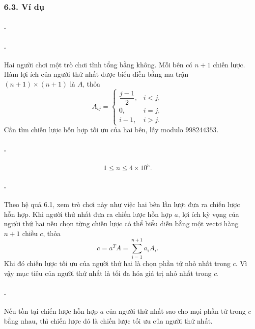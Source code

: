 \documentclass[11pt]{article}
\begin{document}
\subsubsection*{6.3. Ví dụ}

\paragraph{.}
\paragraph{.}
Hai người chơi một trò chơi tĩnh tổng bằng không. Mỗi bên có \(n+1\) chiến
lược. Hàm lợi ích của người thứ nhất được biểu diễn bằng ma trận
\((n+1)\times(n+1)\) là \(A\), thỏa
\[
  A_{ij}=
  \begin{cases}
    \dfrac{j-1}{2}, & i<j,\\
    0, & i=j,\\
    i-1, & i>j.
  \end{cases}
\]
Cần tìm chiến lược hỗn hợp tối ưu của hai bên, lấy modulo \(998244353\).

\paragraph{.}
\[
  1\le n\le 4\times 10^5.
\]

\paragraph{.}
Theo hệ quả 6.1, xem trò chơi này như việc hai bên lần lượt đưa ra chiến lược
hỗn hợp. Khi người thứ nhất đưa ra chiến lược hỗn hợp \(a\), lợi ích kỳ vọng
của người thứ hai nếu chọn từng chiến lược có thể biểu diễn bằng một vectơ hàng
\(n+1\) chiều \(c\), thỏa
\[
  c=a^TA=\sum_{i=1}^{n+1}a_iA_i.
\]
Khi đó chiến lược tối ưu của người thứ hai là chọn phần tử nhỏ nhất trong
\(c\). Vì vậy mục tiêu của người thứ nhất là tối đa hóa giá trị nhỏ nhất trong
\(c\).

\paragraph{.}
Nếu tồn tại chiến lược hỗn hợp \(a\) của người thứ nhất sao cho mọi phần tử
trong \(c\) bằng nhau, thì chiến lược đó là chiến lược tối ưu của người thứ
nhất.
\end{document}
